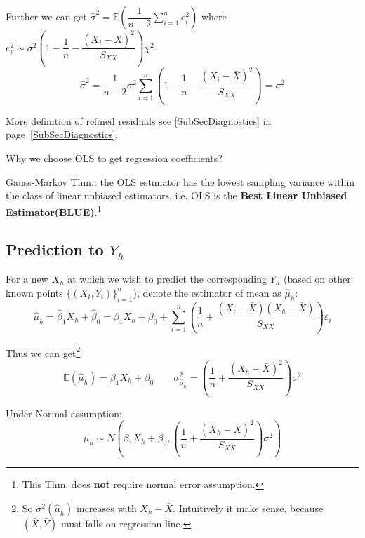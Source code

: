     Further we can get $ \hat{\sigma }^2=\mathbb{E}(\dfrac{1}{n-2}\sum_{i=1}^ne_i^2) $ where $ e_i^2\sim \sigma ^2\left( 1-\dfrac{1}{n}-\dfrac{(X_i-\bar{X})^2}{S_{XX}} \right)\chi^2 $
    \begin{equation}
        \hat{\sigma }^2=\dfrac{1}{n-2}\sigma ^2\sum_{i=1}^n(1-\dfrac{1}{n}-\dfrac{(X_i-\bar{X})^2}{S_{XX}})=\sigma ^2
    \end{equation}
    
    More definition of refined residuals see \autoref{SubSecDiagnostics} in page~\ref{SubSecDiagnostics}.
    


\begin{point}
    Why we choose OLS to get regression coefficients?
\end{point}

    Gauss-Markov Thm.: the OLS estimator has the lowest sampling variance within the class of linear unbiased estimators, i.e. OLS is the \textbf{Best Linear Unbiased Estimator(BLUE)}.\footnote{This Thm. does \textbf{not }require normal error assumption.}



\subsection{Prediction to $ Y_h $}
    For a new $ X_h $ at which we wish to {predict }the corresponding $ Y_h $ (based on other known points $ \{(X_i,Y_i)\}_{i=1}^n $), denote the estimator of mean as $ \hat{\mu}_h $:
    \begin{equation}
        \hat{\mu}_h=\hat{\beta}_1X_h+\hat{\beta}_0 =\beta_1X_h+\beta _0+\sum_{i=1}^n\left( \dfrac{1}{n}+\dfrac{(X_i-\bar{X})(X_h-\bar{X})}{S_{XX}} \right)\varepsilon _i
    \end{equation}
    
    Thus we can get\footnote{So $ \sigma ^2(\hat{\mu }_h) $ increases with $ X_h-\bar{X} $. Intuitively it make sense, because $ (\bar{X},\bar{Y})$ must falls on regression line.}
    \begin{equation}
        \mathbb{E}(\hat{\mu}_h)= \beta _1X_h+\beta _0\qquad \sigma ^2_{\hat{\mu}_h}=\left( \dfrac{1}{n}+\dfrac{(X_h-\bar{X})^2}{S_{XX}} \right)\sigma^2
    \end{equation}
    
    Under Normal assumption:
    \begin{equation}
        \hat{\mu}_h\sim N(\beta _1X_h+\beta _0,\left( \dfrac{1}{n}+\dfrac{(X_h-\bar{X})^2}{S_{XX}} \right)\sigma^2) 
    \end{equation}
    
